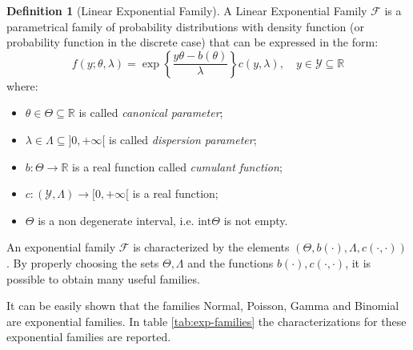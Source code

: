 \documentclass[a4paper, nobind]{templates/ociamthesis}
\theoremstyle{definition}
\newtheorem{definition}{Definition}[chapter]
\theoremstyle{definition}
\theoremstyle{definition}
\theoremstyle{remark}
\begin{document}
\begin{definition}[Linear Exponential Family]
\label{def:linear-exp-family} \iffalse (Linear Exponential Family) \fi{} A Linear Exponential Family \(\mathcal{F}\) is a parametrical family of probability distributions with density function (or probability function in the discrete case) that can be expressed in the form:
\[
f(y; \theta, \lambda) = \exp{\left\{ \frac{y\theta-b(\theta)}{\lambda} \right\}} c(y,\lambda), \quad y\in \mathcal{Y}\subseteq\mathbb{R}
\]
where:

\begin{itemize}
\item $\theta\in\Theta\subseteq\mathbb{R}$ is called \textit{canonical parameter};
\item $\lambda\in\Lambda\subseteq]0, +\infty[$ is called \textit{dispersion parameter};
\item $b: \Theta \rightarrow \mathbb{R}$ is a real function called \textit{cumulant function};
\item $c: (\mathcal{Y}, \Lambda) \rightarrow [0, +\infty[$ is a real function;
\item $\Theta$ is a non degenerate interval, i.e. $\text{int}\Theta$ is not empty.
\end{itemize}
\end{definition}

An exponential family \(\mathcal{F}\) is characterized by the elements \(\left( \Theta, b(\cdot), \Lambda, c(\cdot, \cdot) \right)\). By properly choosing the sets \(\Theta, \Lambda\) and the functions \(b(\cdot), c(\cdot, \cdot)\), it is possible to obtain many useful families.

It can be easily shown that the families Normal, Poisson, Gamma and Binomial are exponential families. In table \ref{tab:exp-families} the characterizations for these exponential families are reported.
\end{document}
